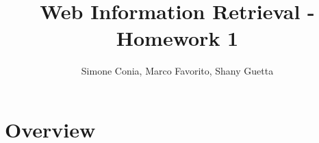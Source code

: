 \documentclass[]{article}
\title{Web Information Retrieval - Homework 1}
\author{Simone Conia, Marco Favorito, Shany Guetta}
\begin{document}
\maketitle

\begin{abstract}

\end{abstract}

\section{Overview}
\end{document}
